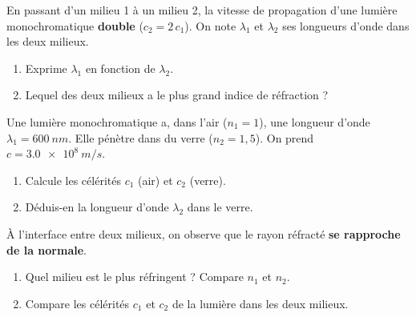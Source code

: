\documentclass[11pt,a4paper]{article}
\begin{document}
\begin{exo}
En passant d'un milieu 1 à un milieu 2, la vitesse de propagation d'une lumière monochromatique
\textbf{double} ($c_2=2\,c_1$). On note $\lambda_1$ et $\lambda_2$ ses longueurs d'onde dans les deux
milieux.
\begin{enumerate}[label=\alph*)]
  \item Exprime $\lambda_1$ en fonction de $\lambda_2$.
  \item Lequel des deux milieux a le plus grand indice de réfraction ?
\end{enumerate}
\end{exo}

\begin{exo}
Une lumière monochromatique a, dans l'air ($n_1=1$), une longueur d'onde $\lambda_1=\qty{600}{nm}$.
Elle pénètre dans du verre ($n_2=1{,}5$). On prend $c=\qty{3.0e8}{m/s}$.
\begin{enumerate}[label=\alph*)]
  \item Calcule les célérités $c_1$ (air) et $c_2$ (verre).
  \item Déduis-en la longueur d'onde $\lambda_2$ dans le verre.
\end{enumerate}
\end{exo}

\begin{exo}
À l'interface entre deux milieux, on observe que le rayon réfracté \textbf{se rapproche de la
normale}.
\begin{center}
\end{center}
\begin{enumerate}[label=\alph*)]
  \item Quel milieu est le plus réfringent ? Compare $n_1$ et $n_2$.
  \item Compare les célérités $c_1$ et $c_2$ de la lumière dans les deux milieux.
\end{enumerate}
\end{exo}
\end{document}
